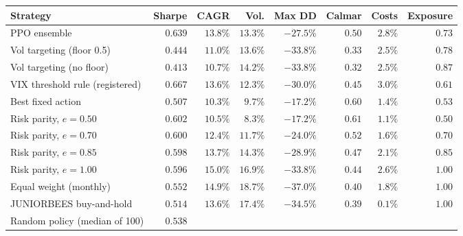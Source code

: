 \begin{tabular}{lrrrrrrr}
\toprule
Strategy & Sharpe & CAGR & Vol. & Max DD & Calmar & Costs & Exposure \\
\midrule
PPO ensemble & $0.639$ & $13.8\%$ & $13.3\%$ & $-27.5\%$ & $0.50$ & $2.8\%$ & $0.73$ \\
Vol targeting (floor 0.5) & $0.444$ & $11.0\%$ & $13.6\%$ & $-33.8\%$ & $0.33$ & $2.5\%$ & $0.78$ \\
Vol targeting (no floor) & $0.413$ & $10.7\%$ & $14.2\%$ & $-33.8\%$ & $0.32$ & $2.5\%$ & $0.87$ \\
VIX threshold rule (registered) & $0.667$ & $13.6\%$ & $12.3\%$ & $-30.0\%$ & $0.45$ & $3.0\%$ & $0.61$ \\
Best fixed action & $0.507$ & $10.3\%$ & $9.7\%$ & $-17.2\%$ & $0.60$ & $1.4\%$ & $0.53$ \\
Risk parity, $e=0.50$ & $0.602$ & $10.5\%$ & $8.3\%$ & $-17.2\%$ & $0.61$ & $1.1\%$ & $0.50$ \\
Risk parity, $e=0.70$ & $0.600$ & $12.4\%$ & $11.7\%$ & $-24.0\%$ & $0.52$ & $1.6\%$ & $0.70$ \\
Risk parity, $e=0.85$ & $0.598$ & $13.7\%$ & $14.3\%$ & $-28.9\%$ & $0.47$ & $2.1\%$ & $0.85$ \\
Risk parity, $e=1.00$ & $0.596$ & $15.0\%$ & $16.9\%$ & $-33.8\%$ & $0.44$ & $2.6\%$ & $1.00$ \\
Equal weight (monthly) & $0.552$ & $14.9\%$ & $18.7\%$ & $-37.0\%$ & $0.40$ & $1.8\%$ & $1.00$ \\
JUNIORBEES buy-and-hold & $0.514$ & $13.6\%$ & $17.4\%$ & $-34.5\%$ & $0.39$ & $0.1\%$ & $1.00$ \\
Random policy (median of 100) & $0.538$ &  &  &  &  &  &  \\
\bottomrule
\end{tabular}
